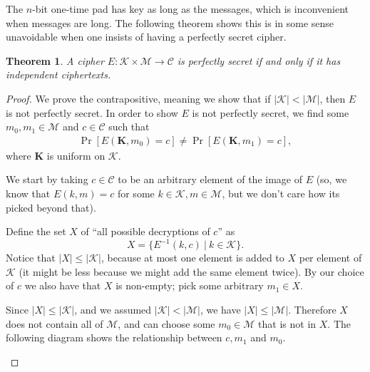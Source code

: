 \documentclass[11pt]{article}
\newtheorem{theorem}{Theorem}
\newcommand{\msgs}{\mathcal{M}}
\newcommand{\ctxts}{\mathcal{C}}
\newcommand{\keys}{\mathcal{K}}
\newcommand{\enc}{E}
\newcommand{\bK}{\mathbf{K}}
\begin{document}
The $n$-bit one-time pad has key as long as the messages, which is inconvenient
when messages are long. The following theorem shows this is in some sense
unavoidable when one insists of having a perfectly secret cipher.
\begin{theorem}
    A cipher $\enc : \keys\times\msgs \to \ctxts$ is perfectly secret
    if and only if it has independent ciphertexts.
\end{theorem}
\begin{proof}
    We prove the contrapositive, meaning we show that if $|\keys| < |\msgs|$,
    then $E$ is not perfectly secret. In order to show $E$ is not perfectly
    secret, we find some $m_0,m_1\in\msgs$ and $c\in\ctxts$ such that
    \begin{align}\label{neqprob}
        \Pr[\enc(\bK,m_0) = c] \neq \Pr[\enc(\bK,m_1) = c],
    \end{align}
    where $\bK$ is uniform on $\keys$.

    We start by taking $c\in\ctxts$ to be an arbitrary element of the image of
    $E$ (so, we know that $E(k,m)=c$ for some $k\in\keys,m\in\msgs$, but we
    don't care how its picked beyond that).

    Define the set $X$ of ``all possible decryptions of $c$'' as
    \[
        X = \{E^{-1}(k,c) \ | \ k\in\keys \}.
    \]
    Notice that $|X| \leq |\keys|$, because at most one element is added to $X$
    per element of $\keys$ (it might be less because we might add the same
    element twice). By our choice of $c$ we also have that $X$ is non-empty;
    pick some arbitrary $m_1\in X$.

    Since $|X| \leq |\keys|$, and we assumed $|\keys| < |\msgs|$, we have
    $|X| \leq |\msgs|$. Therefore $X$ does not contain all of $\msgs$, and
    can choose some $m_0 \in \msgs$ that is not in $X$.
    The following diagram shows the relationship between $c,m_1$ and $m_0$.
    \begin{center}
\end{center}
\end{proof}
\end{document}
